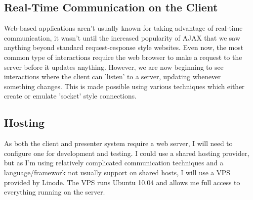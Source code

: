 \documentclass[a4papert,11pt,notitlepage]{ltxdoc}
\begin{document}
\subsection{Real-Time Communication on the Client}
Web-based applications aren't usually known for taking advantage of real-time communication, it wasn't until the increased popularity of AJAX that we saw anything beyond standard request-response style websites. Even now, the most common type of interactions require the web browser to make a request to the server before it updates anything. However, we are now beginning to see interactions where the client can 'listen' to a server, updating whenever something changes. This is made possible using various techniques which either create or emulate 'socket' style connections.

\subsection{Hosting}
As both the client and presenter system require a web server, I will need to configure one for development and testing. I could use a shared hosting provider, but as I'm using relatively complicated communication techniques and a language/framework not usually support on shared hosts, I will use a VPS provided by Linode. The VPS runs Ubuntu 10.04 and allows me full access to everything running on the server.



\end{document}
